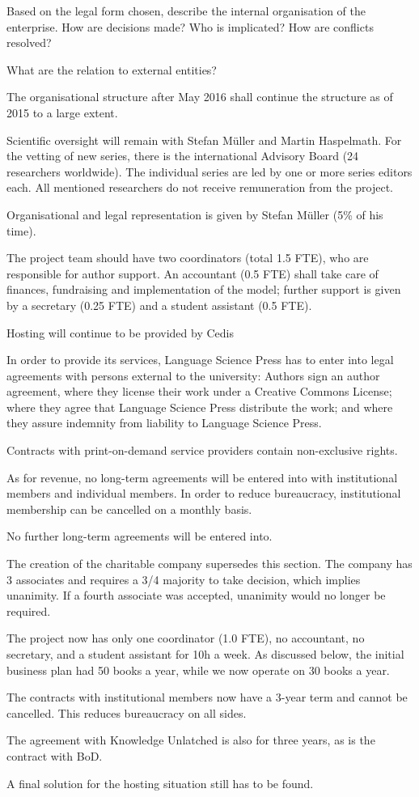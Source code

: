 \documentclass[output=guidelines,nonflat,smallfont,
draftmode
]{langsci/langscibook}
\newcommand{\background}[1]{ 
  \vspace{5mm}
  \renewcommand{\tblslinecolour}{lsDarkBlue}
  \tblssy[red]{explore2}{Background}{\vspace*{-5mm}#1}
}
\newcommand{\langscisolution}[1]{
  \renewcommand{\tblslinecolour}{lsLightBlue}
  \tblssy{langsci}{LangSci solution}{\vspace*{-5mm}#1}
}
\newcommand{\evaluation}[1]{
  \renewcommand{\tblslinecolour}{lsLightOrange}
  \tblssy{receipt}{Evaluation}{\vspace*{-5mm}#1}
}
\renewcommand{\tblssy}[4][black!12]{%
  \renewcommand{\langscisymbol}{#2}\renewcommand{\tblsboxcolor}{#1}
  \begin{mdframed}[style=yellowexercise,frametitle={#3}]
    #4
  \end{mdframed}
}
\begin{document}
\background{Based on the legal form chosen, describe the internal organisation of the enterprise. How are decisions made? Who is implicated? How are conflicts resolved?

What are the relation to external entities?}
\langscisolution{

The organisational structure after May 2016 shall continue the structure as of 2015 to a large extent.

Scientific oversight will remain with Stefan Müller and Martin Haspelmath. For the vetting of new series, there is the international Advisory Board (24 researchers worldwide). The individual series are led by one or more series editors each. All mentioned researchers do not receive remuneration from the project. 

Organisational and legal representation is given by Stefan Müller (5\% of his time).

The project team should have two coordinators (total 1.5 FTE), who are responsible for author support. An accountant (0.5 FTE) shall take care of finances, fundraising and implementation of the model; further support is given by a secretary (0.25 FTE) and a student assistant (0.5 FTE). 

Hosting will continue to be provided by Cedis

In order to provide its services, Language Science Press has to enter into legal agreements with persons external to the university: Authors sign an author agreement, where they license their work under a Creative Commons License; where they agree that Language Science Press distribute the work; and where they assure indemnity from liability to Language Science Press.

Contracts with print-on-demand service providers contain non-exclusive rights. 

As for revenue, no long-term agreements will be entered into with institutional members and individual members. In order to reduce bureaucracy, institutional membership can be cancelled on a monthly basis. 

No further long-term agreements will be entered into. 

}
\evaluation{
The creation of the charitable company supersedes this section. The company has 3 associates and requires a 3/4 majority to take decision, which implies unanimity. If a fourth associate was accepted, unanimity would no longer be required.

The project now has only one coordinator (1.0 FTE), no accountant, no secretary, and a student assistant for 10h a week. As discussed below, the initial business plan had 50 books a year, while we now operate on 30 books a year.

The contracts with institutional members now have a 3-year term and cannot be cancelled. This reduces bureaucracy on all sides. 

The agreement with Knowledge Unlatched is also for three years, as is the contract with BoD.

A final solution for the hosting situation still has to be found.
}
\end{document}
